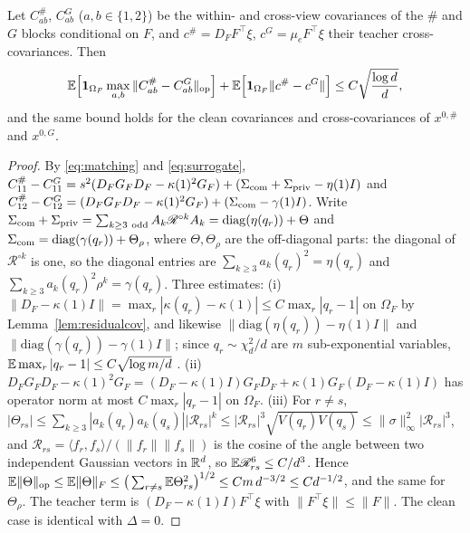 \begin{lemma}\label{lem:bridge}
Let $C^\#_{ab}$, $C^G_{ab}$ ($a,b\in\{1,2\}$) be the within- and cross-view covariances of the $\#$ and $G$
blocks conditional on $F$, and $c^\#=D_FF^\top\xi$, $c^G=\mu_eF^\top\xi$ their teacher cross-covariances. Then
\[
\mathbb{E}\Big[\mathbf 1_{\Omega_F}\max_{a,b}\|C^\#_{ab}-C^G_{ab}\|_{\mathrm{op}}\Big]+\mathbb{E}\Big[\mathbf 1_{\Omega_F}\|c^\#-c^G\|\Big]
\le C\sqrt{\frac{\log d}{d}} ,
\]
and the same bound holds for the clean covariances and cross-covariances of $x^{0,\#}$ and $x^{0,G}$.
\end{lemma}

\begin{proof}
By \eqref{eq:matching} and \eqref{eq:surrogate}, $C^\#_{11}-C^G_{11}=s^2(D_FG_FD_F-\kappa(1)^2G_F)+
(\Sigma_{\rm com}+\Sigma_{\rm priv}-\eta(1)I)$ and $C^\#_{12}-C^G_{12}=(D_FG_FD_F-\kappa(1)^2G_F)+(\Sigma_{\rm com}-\gamma(1)I)$.
Write $\Sigma_{\rm com}+\Sigma_{\rm priv}=\sum_{k\ge3\ \mathrm{odd}}A_k\mathscr R^{\circ k}A_k=\mathrm{diag}(\eta(q_r))+\Theta$
and $\Sigma_{\rm com}=\mathrm{diag}(\gamma(q_r))+\Theta_\rho$, where $\Theta,\Theta_\rho$ are the off-diagonal parts:
the diagonal of $\mathscr R^{\circ k}$ is one, so the diagonal entries are $\sum_{k\ge3}a_k(q_r)^2=\eta(q_r)$ and
$\sum_{k\ge3}a_k(q_r)^2\rho^k=\gamma(q_r)$. Three estimates:
(i) $\|D_F-\kappa(1)I\|=\max_r|\kappa(q_r)-\kappa(1)|\le C\max_r|q_r-1|$ on $\Omega_F$ by Lemma~\ref{lem:residualcov},
and likewise $\|\mathrm{diag}(\eta(q_r))-\eta(1)I\|$ and $\|\mathrm{diag}(\gamma(q_r))-\gamma(1)I\|$; since
$q_r\sim\chi^2_d/d$ are $m$ sub-exponential variables, $\mathbb{E}\max_r|q_r-1|\le C\sqrt{\log m/d}$
\cite[Section~2.8]{Vershynin}. (ii) $D_FG_FD_F-\kappa(1)^2G_F=(D_F-\kappa(1)I)G_FD_F+\kappa(1)G_F(D_F-\kappa(1)I)$ has
operator norm at most $C\max_r|q_r-1|$ on $\Omega_F$. (iii) For $r\ne s$,
$|\Theta_{rs}|\le\sum_{k\ge3}|a_k(q_r)a_k(q_s)||\mathscr R_{rs}|^k\le|\mathscr R_{rs}|^3\sqrt{V(q_r)V(q_s)}\le\|\sigma\|_\infty^2|\mathscr R_{rs}|^3$,
and $\mathscr R_{rs}=\langle f_r,f_s\rangle/(\|f_r\|\|f_s\|)$ is the cosine of the angle between two independent
Gaussian vectors in $\mathbb{R}^d$, so $\mathbb{E}\mathscr R_{rs}^6\le C/d^3$. Hence
$\mathbb{E}\|\Theta\|_{\mathrm{op}}\le\mathbb{E}\|\Theta\|_F\le\big(\sum_{r\ne s}\mathbb{E}\Theta_{rs}^2\big)^{1/2}\le Cm\,d^{-3/2}\le C d^{-1/2}$,
and the same for $\Theta_\rho$. The teacher term is $(D_F-\kappa(1)I)F^\top\xi$ with $\|F^\top\xi\|\le\|F\|$. The
clean case is identical with $\Delta=0$.
\end{proof}


